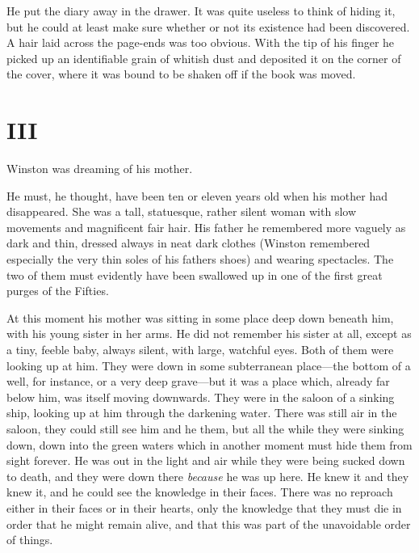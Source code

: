 He put the diary away in the drawer. It was quite useless to think of
hiding it, but he could at least make sure whether or not its existence
had been discovered. A hair laid across the page-ends was too obvious.
With the tip of his finger he picked up an identifiable grain of whitish
dust and deposited it on the corner of the cover, where it was bound to
be shaken off if the book was moved.


\section{III}\label{iii}

Winston was dreaming of his mother.

He must, he thought, have been ten or eleven years old when his mother
had disappeared. She was a tall, statuesque, rather silent woman with
slow movements and magnificent fair hair. His father he remembered more
vaguely as dark and thin, dressed always in neat dark clothes (Winston
remembered especially the very thin soles of his
father\textquotesingle s shoes) and wearing spectacles. The two of them
must evidently have been swallowed up in one of the first great purges
of the Fifties.

At this moment his mother was sitting in some place deep down beneath
him, with his young sister in her arms. He did not remember his sister
at all, except as a tiny, feeble baby, always silent, with large,
watchful eyes. Both of them were looking up at him. They were down in
some subterranean place---the bottom of a well, for instance, or a very
deep grave---but it was a place which, already far below him, was itself
moving downwards. They were in the saloon of a sinking ship, looking up
at him through the darkening water. There was still air in the saloon,
they could still see him and he them, but all the while they were
sinking down, down into the green waters which in another moment must
hide them from sight forever. He was out in the light and air while they
were being sucked down to death, and they were down there \emph{because}
he was up here. He knew it and they knew it, and he could see the
knowledge in their faces. There was no reproach either in their faces or
in their hearts, only the knowledge that they must die in order that he
might remain alive, and that this was part of the unavoidable order of
things.

